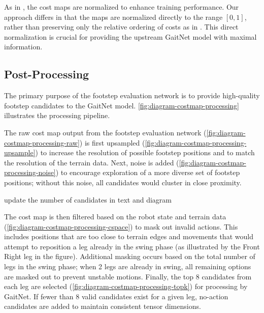 As in \cite{bratta_contactnet_2024}, the cost maps are normalized to
enhance training performance. Our approach differs in that the maps
are normalized directly to the range $[0, 1]$, rather than preserving
only the relative ordering of costs as in
\cite{bratta_contactnet_2024}. This direct normalization is crucial
for providing the upstream GaitNet model with maximal information.

\subsection{Post-Processing}
\label{subsec:methodology-contactnet-post-processing}

The primary purpose of the footstep evaluation network is to provide
high-quality footstep candidates to the GaitNet model.
\autoref{fig:diagram-costmap-processing} illustrates the processing pipeline.

The raw cost map output from the footstep evaluation network
(\autoref{fig:diagram-costmap-processing-raw}) is first upsampled
(\autoref{fig:diagram-costmap-processing-upsample}) to increase the
resolution of possible footstep positions and to match the resolution
of the terrain data. Next, noise is added
(\autoref{fig:diagram-costmap-processing-noise}) to encourage
exploration of a more diverse set of footstep positions; without this
noise, all candidates would cluster in close proximity.

\begin{todo}
  update the number of candidates in text and diagram
\end{todo}

The cost map is then filtered based on the robot state and terrain
data (\autoref{fig:diagram-costmap-processing-cspace}) to mask out
invalid actions. This includes positions that are too close to
terrain edges and movements that would attempt to reposition a leg
already in the swing phase (as illustrated by the Front Right leg in
the figure). Additional masking occurs based on the total number of
legs in the swing phase; when 2 legs are already in swing, all
remaining options are masked out to prevent unstable motions.
Finally, the top 8 candidates from each leg are selected
(\autoref{fig:diagram-costmap-processing-topk}) for processing by
GaitNet. If fewer than 8 valid candidates exist for a given leg,
no-action candidates are added to maintain consistent tensor dimensions.

\def\imgwidth{0.16\textwidth}
\def\xgap{2em}          %
\def\arrowwidth{1.2em}  %
\def\arrowshift{0.5em} %

